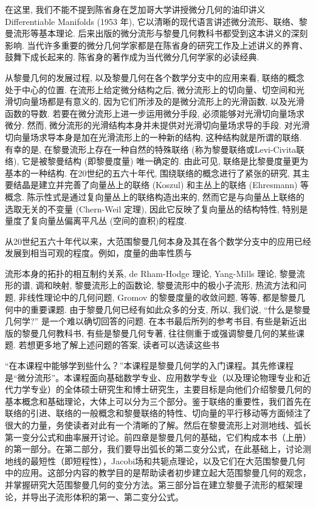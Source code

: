 在这里, 我们不能不提到陈省身在芝加哥大学讲授微分几何的油印讲义 Differentiable Manifolds (1953 年), 它以清晰的现代语言讲述微分流形、联络、黎曼流形等基本理论. 后来出版的微分流形与黎曼几何教科书都受到这本讲义的深刻影响. 当代许多重要的微分几何学家都是在陈省身的研究工作及上述讲义的养育、鼓舞下成长起来的. 陈省身的著作成为当代微分几何学家的必读经典.

从黎曼几何的发展过程, 以及黎曼几何在各个数学分支中的应用来看, 联络的概念处于中心的位置. 在流形上给定微分结构之后, 微分流形上的切向量、切空间和光滑切向量场都是有意义的, 因为它们所涉及的是微分流形上的光滑函数, 以及光滑函数的导数. 若要在微分流形上进一步运用微分手段, 必须能够对光滑切向量场求微分. 然而, 微分流形的光滑结构本身并未提供对光滑切向量场求导的手段. 对光滑切向量场求导本身是加在光滑流形上的一种新的结构, 这种结构就是所谓的联络. 有幸的是, 在黎曼流形上存在一种自然的特殊联络 (称为黎曼联络或Levi-Civita联络), 它是被黎曼结构 (即黎曼度量) 唯一确定的. 由此可见, 联络是比黎曼度量更为基本的一种结构. 在20世纪的五六十年代, 围绕联络的概念进行了紧张的研究, 其主要结晶是建立并完善了向量丛上的联络 (Koszul) 和主丛上的联络 (Ehresmann) 等概念. 陈示性式是通过复向量丛上的联络构造出来的, 然而它是与向量丛上联络的选取无关的不变量 (Chern-Weil 定理), 因此它反映了复向量丛的结构特性, 特别是量度了复向量丛偏离平凡丛 (空间的直积)的程度.

从20世纪五六十年代以来，大范围黎曼几何本身及其在各个数学分支中的应用已经发展到相当可观的程度。例如，度量的曲率性质与

流形本身的拓扑的相互制约关系, de Rham-Hodge 理论, Yang-Mills 理论, 黎曼流形的谱, 调和映射, 黎曼流形上的函数论, 黎曼流形中的极小子流形, 热流方法和问题, 非线性理论中的几何问题, Gromov 的黎曼度量的收敛问题, 等等, 都是黎曼几何中的重要课题. 由于黎曼几何已经有如此众多的分支, 所以, 我们说, “什么是黎曼几何学?” 是一个难以确切回答的问题. 在本书最后所列的参考书目, 有些是新近出版的黎曼几何教科书, 有些是黎曼几何专著, 往往侧重于或强调黎曼几何的某些课题. 若想更多地了解上述问题的答案, 读者可以选读这些书

“在本课程中能够学到些什么？”本课程是黎曼几何学的入门课程。其先修课程是“微分流形”。本课程面向基础数学专业、应用数学专业（以及理论物理专业和近代力学专业）的全体硕士研究生和博士研究生，主要目标是向他们介绍黎曼几何的基本概念和基础理论，大体上可以分为三个部分。鉴于联络的重要性，我们首先在联络的引进、联络的一般概念和黎曼联络的特性、切向量的平行移动等方面倾注了很大的力量，务使读者对此有一个清晰的了解。然后在黎曼流形上对测地线、弧长第一变分公式和曲率展开讨论。前四章是黎曼几何的基础，它们构成本书（上册）的第一部分。在第二部分，我们要导出弧长的第二变分公式，在此基础上，讨论测地线的最短性（即短程性），Jacobi场和共轭点理论，以及它们在大范围黎曼几何中的应用。这部分内容的教学目的是帮助读者初步建立起大范围黎曼几何的观念，并掌握研究大范围黎曼几何的变分方法。第三部分旨在建立黎曼子流形的框架理论，并导出子流形体积的第一、第二变分公式。

